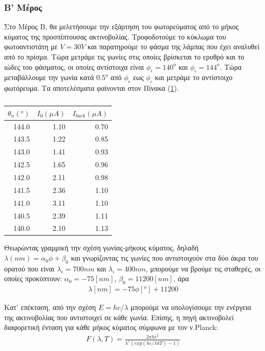 \documentclass[a4paper]{article}
\begin{document}
		
	\subsubsection*{B' Μέρος}
	
		Στο Μέρος Β, θα μελετήσουμε την εξάρτηση του φωτορεύματος από το μήκος κύματος της προσπίπτουσας ακτινοβολίας. Τροφοδοτούμε το κύκλωμα του φωτοαντιστάτη με $V=30V$ και παρατηρούμε το φάσμα της λάμπας που έχει αναλυθεί από το πρίσμα. Τώρα μετράμε τις γωνίες στις οποίες βρίσκεται το ερυθρό και το ιώδες του φάσματος, οι οποίες αντίστοιχα είναι $\phi_{\epsilon} = 140^o$ και 
		$\phi_{\iota}=144^o $.
 Τώρα μεταβάλλουμε την γωνία κατά $0.5^o$ από $\phi_{\epsilon}$ εως
      $\phi_{\iota}$ και μετράμε το αντίστοιχο φωτόρευμα. Τα αποτελέσματα φαίνονται στον Πίνακα (\ref{mat3}).
      
		\begin{table}[h!]
			\centering
			\begin{tabular}{r|r|r}
				 $\theta_n(^o)$ & $ I_0(\mu A)$ & $I_{back}(\mu A)$ \\\hline\hline
				144.0& 1.10& 0.70\\
				143.5& 1.22& 0.85\\
				143.0& 1.41& 0.93\\
				142.5& 1.65& 0.96\\
				142.0& 2.11& 0.98\\
				141.5& 2.36& 1.10\\
				141.0& 3.11& 1.10\\
				140.5& 2.39& 1.11\\
				140.0& 2.10& 1.13
			\end{tabular}
			\caption{ }
			\label{mat3}
		\end{table}
		
		Θεωρώντας γραμμική την σχέση γωνίας-μήκους κύματος, δηλαδή $\lambda(nm)=\alpha_0\phi+\beta_0$ και γνωρίζοντας τις γωνίες που αντιστοιχούν στα δύο άκρα του ορατού που είναι $\lambda_{\epsilon}=700nm$ και $\lambda_{\iota} = 400nm$, μπορούμε να βρούμε τις σταθερές, οι οποίες προκύπτουν: $\alpha_0 = -75[nm]$, $\beta_0=11200[nm]$, άρα 
		\begin{align}\label{5}
			\lambda[nm] = -75\phi[^o] + 11200 
		\end{align}
		
		Κατ' επέκταση, από την σχέση $E = hc/\lambda$ μπορούμε να υπολογίσουμε την ενέργεια της ακτινοβολίας που αντιστοιχεί σε κάθε γωνία. Επίσης, η πηγή ακτινοβολεί διαφορετική ένταση για κάθε μήκος κύματος σύμφωνα με τον ν.Planck:
		\begin{align}\label{6}
			F(\lambda ,T) = \frac{2\pi hc^2}{\lambda^5(exp(hc/\lambda kT ) - 1 )}
		\end{align}
		
\end{document}
